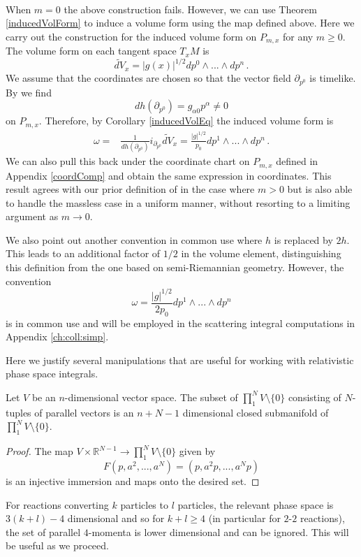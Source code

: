 \\
When $m=0$ the above construction fails.  However, we can use Theorem \ref{inducedVolForm} to induce a volume form using the map  defined above. Here we carry out the construction for the induced volume form on $P_{m,x}$ for any $m\geq 0$. The volume form on each tangent space $T_xM$ is
\begin{equation}
\tilde{dV}_x=|g(x)|^{1/2}dp^0\wedge...\wedge dp^n\,.
\end{equation}
We assume that the coordinates are chosen so that the vector field $\partial_{p^0}$ is timelike. By  we find
\begin{equation}
dh(\partial_{p^0})=g_{\alpha 0}p^\alpha\neq 0
\end{equation}
on $P_{m,x}$.  Therefore, by Corollary \ref{inducedVolEq} the induced volume form is
\begin{align}\label{massShellVol}
\omega=&\frac{1}{dh(\partial_{p^0})} i_{\partial_{p^0}} \tilde{dV}_x
=\frac{|g|^{1/2}}{p_0}dp^1\wedge...\wedge dp^n\,.
\end{align}
We can also pull this back under the coordinate chart on $P_{m,x}$ defined in Appendix \ref{coordComp} and obtain the same expression in coordinates. This result agrees with our prior definition of  in the case where $m>0$ but is also able to handle the massless case in a uniform manner, without resorting to a limiting argument as $m\rightarrow 0$.

We also point out another convention in common use where $h$ is replaced by $2h$.  This leads to an additional factor of $1/2$ in the volume element, distinguishing this definition from the one based on semi-Riemannian geometry.  However, the convention
\begin{equation}
\omega=\frac{|g|^{1/2}}{2p_0}dp^1\wedge...\wedge dp^n
\end{equation}
 is in common use and will be employed in the scattering integral computations in Appendix \ref{ch:coll:simp}.

Here we justify several manipulations that are useful for working with relativistic phase space integrals.

\begin{lemma}\label{parallel:lemma}
Let $V$ be an $n$-dimensional vector space.  The subset of $\prod_1^N V\setminus\{0\}$ consisting of $N$-tuples of parallel vectors is an $n+N-1$ dimensional closed submanifold of $\prod_1^N V\setminus\{0\}$.
\end{lemma}
\begin{proof}
The map $V\times \mathbb{R}^{N-1}\rightarrow  \prod_1^N V\setminus\{0\}$ given by
\begin{equation}
F(p,a^2,...,a^N)=(p,a^2p,...,a^{N}p)
\end{equation}
is an injective immersion and maps onto the desired set.
\end{proof}
For reactions converting $k$ particles to $l$ particles, the relevant phase space is $3(k+l)-4$ dimensional and so for $k+l\geq 4$ (in particular for $2$-$2$ reactions), the set of parallel $4$-momenta is lower dimensional and can be ignored. This will be useful as we proceed.

